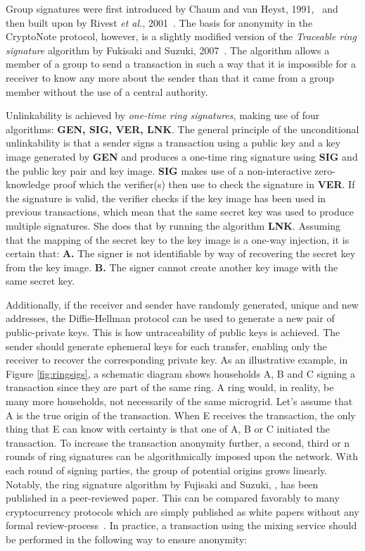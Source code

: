 Group signatures were first introduced by Chaum and van Heyst, 1991,~\cite{Chaum1991} and then built upon by Rivest \textit{et al.}, 2001~\cite{Rivest2001}. The basis for anonymity in the CryptoNote protocol, however, is a slightly modified version of the \textit{Traceable ring signature} algorithm by Fukisaki and Suzuki, 2007~\cite{Fujisaki2007}. The algorithm allows a member of a group to send a transaction in such a way that it is impossible for a receiver to know any more about the sender than that it came from a group member without the use of a central authority.

Unlinkability is achieved by \textit{one-time ring signatures}, making use of four algorithms: \textbf{GEN, SIG, VER, LNK}. The general principle of the unconditional unlinkability is that a sender signs a transaction using a public key and a key image generated by \textbf{GEN} and produces a one-time ring signature using \textbf{SIG} and the public key pair and key image. \textbf{SIG} makes use of a non-interactive zero-knowledge proof which the verifier(s) then use to check the signature in \textbf{VER}. If the signature is valid, the verifier checks if the key image has been used in previous transactions, which mean that the same secret key was used to produce multiple signatures. She does that by running the algorithm \textbf{LNK}. Assuming that the mapping of the secret key to the key image is a one-way injection, it is certain that: \textbf{A.} The signer is not identifiable by way of recovering the secret key from the key image. \textbf{B.} The signer cannot create another key image with the same secret key. 

Additionally, if the receiver and sender have randomly generated, unique and new addresses, the Diffie-Hellman protocol can be used to generate a new pair of public-private keys. This is how untraceability of public keys is achieved. The sender should generate ephemeral keys for each transfer, enabling only the receiver to recover the corresponding private key. As an illustrative example, in Figure \ref{fig:ringsigs}, a schematic diagram shows households A, B and C signing a transaction since they are part of the same ring. A ring would, in reality, be many more households, not necessarily of the same microgrid. Let's assume that A is the true origin of the transaction. When E receives the transaction, the only thing that E can know with certainty is that one of A, B or C initiated the transaction. To increase the transaction anonymity further, a second, third or n rounds of ring signatures can be algorithmically imposed upon the network. With each round of signing parties, the group of potential origins grows linearly. Notably, the ring signature algorithm by Fujisaki and Suzuki, \cite{Fujisaki2007}, has been published in a peer-reviewed paper. This can be compared favorably to many cryptocurrency protocols which are simply published as white papers without any formal review-process~\cite{cryptonote}.
In practice, a transaction using the mixing service should be performed in the following way to ensure anonymity:


